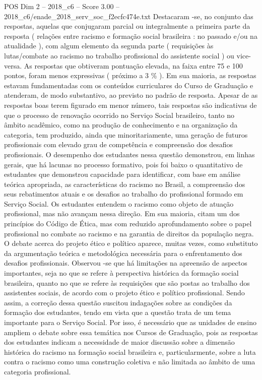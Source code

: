 \begin{textsample}{POS Dim 2 – 2018\_c6 – Score 3.00 – 2018\_c6/enade\_2018\_serv\_soc\_f2ecfc474e.txt}
Destacaram -se, no conjunto das respostas, aquelas que conjugaram parcial ou integralmente a primeira parte da resposta ( relações entre racismo e formação social brasileira : no passado e/ou na atualidade ), com algum elemento da segunda parte ( requisições às lutas/combate ao racismo no trabalho profissional do assistente social ) ou vice-versa.
As respostas que obtiveram pontuação elevada, na faixa entre 75 e 100 pontos, foram menos expressivas ( próximo a 3 \% ).
Em sua maioria, as respostas estavam fundamentadas com os conteúdos curriculares do Curso de Graduação e atenderam, de modo substantivo, ao previsto no padrão de resposta.
Apesar de as respostas boas terem figurado em menor número, tais respostas são indicativas de que o processo de renovação ocorrido no Serviço Social brasileiro, tanto no âmbito acadêmico, como na produção de conhecimento e na organização da categoria, tem produzido, ainda que minoritariamente, uma geração de futuros profissionais com elevado grau de competência e compreensão dos desafios profissionais.
O desempenho dos estudantes nessa questão demonstrou, em linhas gerais, que há lacunas no processo formativo, pois foi baixo o quantitativo de estudantes que demonstrou capacidade para identificar, com base em análise teórica apropriada, as características do racismo no Brasil, a compreensão dos seus rebatimentos atuais e os desafios ao trabalho do profissional formado em Serviço Social.
Os estudantes entendem o racismo como objeto de atuação profissional, mas não avançam nessa direção.
Em sua maioria, citam um dos princípios do Código de Ética, mas com reduzido aprofundamento sobre o papel profissional no combate ao racismo e na garantia de direitos da população negra.
O debate acerca do projeto ético e político aparece, muitas vezes, como substituto da argumentação teórica e metodológica necessária para o enfrentamento dos desafios profissionais.
Observou -se que há limitações na apreensão de aspectos importantes, seja no que se refere à perspectiva histórica da formação social brasileira, quanto no que se refere às requisições que são postas ao trabalho dos assistentes sociais, de acordo com o projeto ético e político profissional.
Sendo assim, a correção dessa questão suscitou indagações sobre as condições da formação dos estudantes, tendo em vista que a questão trata de um tema importante para o Serviço Social.
Por isso, é necessário que as unidades de ensino ampliem o debate sobre essa temática nos Cursos de Graduação, pois as respostas dos estudantes indicam a necessidade de maior discussão sobre a dimensão histórica do racismo na formação social brasileira e, particularmente, sobre a luta contra o racismo como uma construção coletiva e não limitada ao âmbito de uma categoria profissional.

\end{textsample}
